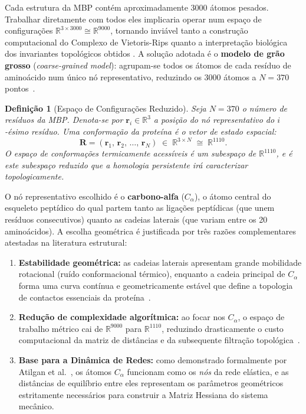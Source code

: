 \documentclass[12pt, a4paper]{article}
\newtheorem{definition}{Definição}
\begin{document}
Cada estrutura da MBP contém aproximadamente 3000 átomos pesados. Trabalhar diretamente com todos eles implicaria operar num espaço de configurações $\mathbb{R}^{3 \times 3000} \cong \mathbb{R}^{9000}$, tornando inviável tanto a construção computacional do Complexo de Vietoris-Rips quanto a interpretação biológica dos invariantes topológicos obtidos \cite{cang2015topological}. A solução adotada é o \textbf{modelo de grão grosso} (\textit{coarse-grained model}): agrupam-se todos os átomos de cada resíduo de aminoácido num único nó representativo, reduzindo os 3000 átomos a $N = 370$ pontos~\cite{kovacev2016}.

\begin{definition}[Espaço de Configurações Reduzido]
Seja $N = 370$ o número de resíduos da MBP. Denota-se por $\mathbf{r}_i \in \mathbb{R}^3$ a posição do nó representativo do $i$-ésimo resíduo. Uma \emph{conformação} da proteína é o vetor de estado espacial:
$$
\mathbf{R} = (\mathbf{r}_1,\, \mathbf{r}_2,\, \ldots,\, \mathbf{r}_N) \;\in\; \mathbb{R}^{3 \times N} \;\cong\; \mathbb{R}^{1110}.
$$
O espaço de conformações termicamente acessíveis é um subespaço de $\mathbb{R}^{1110}$, e é este subespaço reduzido que a homologia persistente irá caracterizar topologicamente.
\end{definition}

O nó representativo escolhido é o \textbf{carbono-alfa} ($C_\alpha$), o átomo central do esqueleto peptídico do qual partem tanto as ligações peptídicas (que unem resíduos consecutivos) quanto as cadeias laterais (que variam entre os 20 aminoácidos). A escolha geométrica é justificada por três razões complementares atestadas na literatura estrutural:

\begin{enumerate}
    \item \textbf{Estabilidade geométrica:} as cadeias laterais apresentam grande mobilidade rotacional (ruído conformacional térmico), enquanto a cadeia principal de $C_\alpha$ forma uma curva contínua e geometricamente estável que define a topologia de contactos essenciais da proteína~\cite{cang2015}.
    \item \textbf{Redução de complexidade algorítmica:} ao focar nos $C_\alpha$, o espaço de trabalho métrico cai de $\mathbb{R}^{9000}$ para $\mathbb{R}^{1110}$, reduzindo drasticamente o custo computacional da matriz de distâncias e da subsequente filtração topológica~\cite{cang2015}.
    \item \textbf{Base para a Dinâmica de Redes:} como demonstrado formalmente por Atilgan et al.~\cite{atilgan2001}, os átomos $C_\alpha$ funcionam como os \emph{nós} da rede elástica, e as distâncias de equilíbrio entre eles representam os parâmetros geométricos estritamente necessários para construir a Matriz Hessiana do sistema mecânico.
\end{enumerate}
\end{document}
